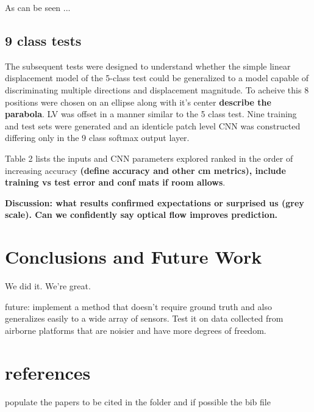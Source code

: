 \documentclass{article}
\begin{document}
As can be seen ... 

\subsection{9 class tests}
The subsequent tests were designed to understand whether the simple linear displacement model of the 5-class test could be generalized to a model capable of discriminating multiple directions and displacement magnitude. To acheive this 8 positions were chosen on an ellipse along with it's center \textbf{describe the parabola}. LV was offset in a manner similar to the 5 class test. Nine training and test sets were generated and an identicle patch level CNN was constructed differing only in the 9 class softmax output layer. 

Table 2 lists the inputs and CNN parameters explored ranked in the order of increasing accuracy \textbf{(define accuracy and other cm metrics), include training vs test error and conf mats if room allows}.  

 \textbf{Discussion: what results confirmed expectations or surprised us (grey scale). Can we confidently say optical flow improves prediction. }



\section{Conclusions and Future Work} %
\label{sec:conclusions_and_future_work}
We did it. We're great.

future: implement a method that doesn't require ground truth and also generalizes easily to a wide array of sensors. Test it on data collected from airborne platforms that are noisier and have more degrees of freedom. 



\section{references}
populate the papers to be cited in the folder and if possible the bib file




\end{document}
